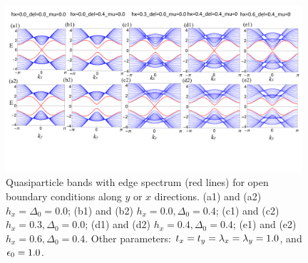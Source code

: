 \documentclass[twocolumn,prl,floatfix,citeautoscript,nofootinbib,superscriptaddress]{revtex4}
\begin{document}
\begin{figure}[h]
\centering\includegraphics[width=0.98\textwidth]{FigS0.pdf}
\caption{Quasiparticle bands with edge spectrum (red lines) for open
boundary conditions along $y$ or $x$ directions. (a1) and (a2) $h_{x}=\Delta
_{0}=0.0$; (b1) and (b2) $h_{x}=0.0,\Delta _{0}=0.4$; (c1) and (c2) $%
h_{x}=0.3,\Delta _{0}=0.0$; (d1) and (d2) $h_{x}=0.4,\Delta _{0}=0.4$; (e1)
and (e2) $h_{x}=0.6,\Delta _{0}=0.4$. Other parameters: $t_{x}=t_{y}=\protect%
\lambda _{x}=\protect\lambda _{y}=1.0$, and $\protect\epsilon _{0}=1.0$.}
\label{FigS0}
\end{figure}
\end{document}
